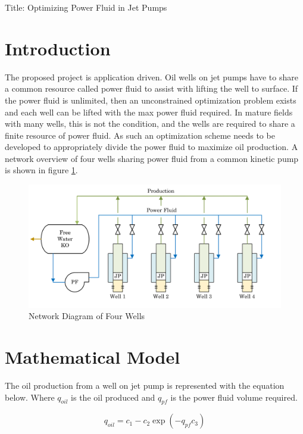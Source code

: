\documentclass{article}
\begin{document}
\begin{center}
    \Large Title: Optimizing Power Fluid in Jet Pumps \par
\end{center}

\section{Introduction}

The proposed project is application driven. Oil wells on jet pumps have to share a common resource called power fluid to assist with lifting the well to surface. If the power fluid is unlimited, then an unconstrained optimization problem exists and each well can be lifted with the max power fluid required. In mature fields with many wells, this is not the condition, and the wells are required to share a finite resource of power fluid. As such an optimization scheme needs to be developed to appropriately divide the power fluid to maximize oil production. A network overview of four wells sharing power fluid from a common kinetic pump is shown in figure \ref{fig:jetpump_network}.

\begin{figure}[H]
    \centering
    \includegraphics[width=1\linewidth]{figures/network_diagram.PNG}
    \caption{Network Diagram of Four Wells}
    \label{fig:jetpump_network}
\end{figure}

\section{Mathematical Model}

The oil production from a well on jet pump is represented with the equation below. Where $q_{oil}$ is the oil produced and $q_{pf}$ is the power fluid volume required.

\begin{equation*}
    q_{oil} = c_{1} - c_{2} \exp{(-q_{pf} c_{3})}
\end{equation*}
\end{document}
